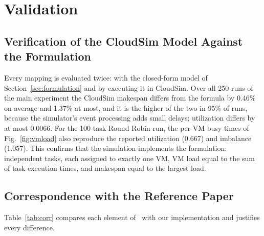 \documentclass[journal,onecolumn,12pt]{IEEEtran}
\begin{document}
\section{Validation}\label{sec:validation}

\subsection{Verification of the CloudSim Model Against the Formulation}\label{sec:verify}
Every mapping is evaluated twice: with the closed-form model of Section~\ref{sec:formulation} and by executing it in CloudSim. Over all 250 runs of the main experiment the CloudSim makespan differs from the formula by 0.46\% on average and 1.37\% at most, and it is the higher of the two in 95\% of runs, because the simulator's event processing adds small delays; utilization differs by at most 0.0066. For the 100-task Round Robin run, the per-VM busy times of Fig.~\ref{fig:vmload} also reproduce the reported utilization (0.667) and imbalance (1.057). This confirms that the simulation implements the formulation: independent tasks, each assigned to exactly one VM, VM load equal to the sum of task execution times, and makespan equal to the largest load.

\subsection{Correspondence with the Reference Paper}
Table~\ref{tab:corr} compares each element of~\cite{dehury} with our implementation and justifies every difference.
\end{document}
